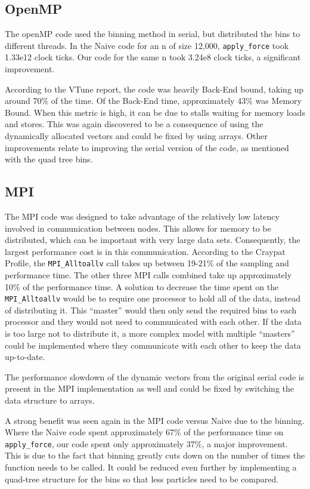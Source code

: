 \documentclass{article}
\begin{document}
\subsection{OpenMP}
The openMP code used the binning method in serial, but distributed the bins to
different threads. In the Naive code for an n of size 12,000,
\texttt{apply\_force} took 1.33e12 clock ticks. Our code for the same n took
3.24e8 clock ticks, a significant improvement.

According to the VTune report, the code was heavily Back-End bound, taking up
around 70\% of the time. Of the Back-End time, approximately 43\% was Memory
Bound. When this metric is high, it can be due to stalls waiting for memory
loads and stores. This was again discovered to be a consequence of using the
dynamically allocated vectors and could be fixed by using arrays. Other
improvements relate to improving the serial version of the code, as mentioned
with the quad tree bins.
\subsection{MPI}
The MPI code was designed to take advantage of the relatively low latency
involved in communication between nodes. This allows for memory to be
distributed, which can be important with very large data sets. Consequently, the
largest performance cost is in this communication. According to the Craypat
Profile, the \texttt{MPI\_Alltoallv} call takes up between 19-21\% of the
sampling and performance time. The other three MPI calls combined take up
approximately 10\% of the performance time. A solution to decrease the time
spent on the \texttt{MPI\_Alltoallv} would be to require one processor to hold
all of the data, instead of distributing it.  This “master” would then only send
the required bins to each processor and they would not need to communicated with
each other. If the data is too large not to distribute it, a more complex model
with multiple “masters” could be implemented where they communicate with each
other to keep the data up-to-date.

The performance slowdown of the dynamic vectors from the original serial code is
present in the MPI implementation as well and could be fixed by switching the
data structure to arrays.

A strong benefit was seen again in the MPI code versus Naive due to the binning.
Where the Naive code spent approximately 67\% of the performance time on
\texttt{apply\_force}, our code spent only approximately 37\%, a major
improvement. This is due to the fact that binning greatly cuts down on the
number of times the function needs to be called. It could be reduced even
further by implementing a quad-tree structure for the bins so that less
particles need to be compared.
\end{document}
